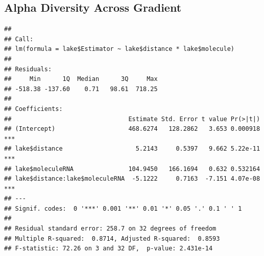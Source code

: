 \documentclass[]{article}
\newenvironment{Shaded}{\begin{snugshade}}{\end{snugshade}}
\newcommand{\KeywordTok}[1]{\textcolor[rgb]{0.13,0.29,0.53}{\textbf{#1}}}
\newcommand{\DataTypeTok}[1]{\textcolor[rgb]{0.13,0.29,0.53}{#1}}
\newcommand{\StringTok}[1]{\textcolor[rgb]{0.31,0.60,0.02}{#1}}
\newcommand{\CommentTok}[1]{\textcolor[rgb]{0.56,0.35,0.01}{\textit{#1}}}
\newcommand{\OperatorTok}[1]{\textcolor[rgb]{0.81,0.36,0.00}{\textbf{#1}}}
\newcommand{\NormalTok}[1]{#1}
\begin{document}
\subsection{Alpha Diversity Across
Gradient}\label{alpha-diversity-across-gradient}

\begin{Shaded}
\end{Shaded}

\begin{verbatim}
## 
## Call:
## lm(formula = lake$Estimator ~ lake$distance * lake$molecule)
## 
## Residuals:
##     Min      1Q  Median      3Q     Max 
## -518.38 -137.60    0.71   98.61  718.25 
## 
## Coefficients:
##                                Estimate Std. Error t value Pr(>|t|)    
## (Intercept)                    468.6274   128.2862   3.653 0.000918 ***
## lake$distance                    5.2143     0.5397   9.662 5.22e-11 ***
## lake$moleculeRNA               104.9450   166.1694   0.632 0.532164    
## lake$distance:lake$moleculeRNA  -5.1222     0.7163  -7.151 4.07e-08 ***
## ---
## Signif. codes:  0 '***' 0.001 '**' 0.01 '*' 0.05 '.' 0.1 ' ' 1
## 
## Residual standard error: 258.7 on 32 degrees of freedom
## Multiple R-squared:  0.8714, Adjusted R-squared:  0.8593 
## F-statistic: 72.26 on 3 and 32 DF,  p-value: 2.431e-14
\end{verbatim}
\end{document}
